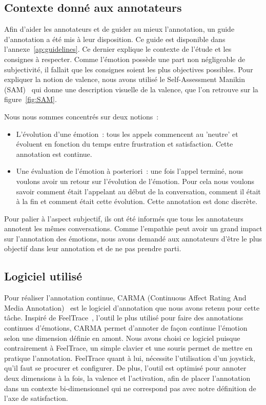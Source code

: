 \subsection{Contexte donné aux annotateurs}
Afin d'aider les annotateurs et de guider au mieux l'annotation, un guide d'annotation a été mis à leur disposition. Ce guide est disponible dans l'annexe~\ref{ap:guidelines}. Ce dernier explique le contexte de l'étude et les consignes à respecter. Comme l'émotion possède une part non négligeable de subjectivité, il fallait que les consignes soient les plus objectives possibles.
Pour expliquer la notion de valence, nous avons utilisé le Self-Assessment Manikin (SAM)~\cite{SAM} qui donne une description visuelle de la valence, que l'on retrouve sur la figure~\ref{fig:SAM}.


Nous nous sommes concentrés sur deux notions :
\begin{itemize}
  \item L'évolution d'une émotion : tous les appels commencent au 'neutre' et évoluent en fonction du temps entre frustration et satisfaction. Cette annotation est continue.
  \item Une évaluation de l'émotion à posteriori : une fois l'appel terminé, nous voulons avoir un retour sur l'évolution de l'émotion. Pour cela nous voulons savoir comment était l'appelant au début de la conversation, comment il était à la fin et comment était cette évolution. Cette annotation est donc discrète.
\end{itemize}

Pour palier à l'aspect subjectif, ils ont été informés que tous les annotateurs annotent les mêmes conversations. Comme l'empathie peut avoir un grand impact sur l'annotation des émotions, nous avons demandé aux annotateurs d'être le plus objectif dans leur annotation et de ne pas prendre parti.

\subsection{Logiciel utilisé}

Pour réaliser l'annotation continue, CARMA (Continuous Affect Rating And Media Annotation)~\cite{CARMA} est le logiciel d'annotation que nous avons retenu pour cette tâche. Inspiré de FeelTrace~\cite{FeelTrace}, l'outil le plus utilisé pour faire des annotations continues d'émotions, CARMA permet d'annoter de façon continue l'émotion selon une dimension définie en amont. Nous avons choisi ce logiciel puisque contrairement à FeelTrace, un simple clavier et une souris permet de mettre en pratique l'annotation. FeelTrace quant à lui, nécessite l'utilisation d'un joystick, qu'il faut se procurer et configurer. De plus, l’outil est optimisé pour annoter deux dimensions à la fois, la valence et l'activation, afin de placer l'annotation dans un contexte bi-dimensionnel qui ne correspond pas avec notre définition de l'axe de satisfaction.

